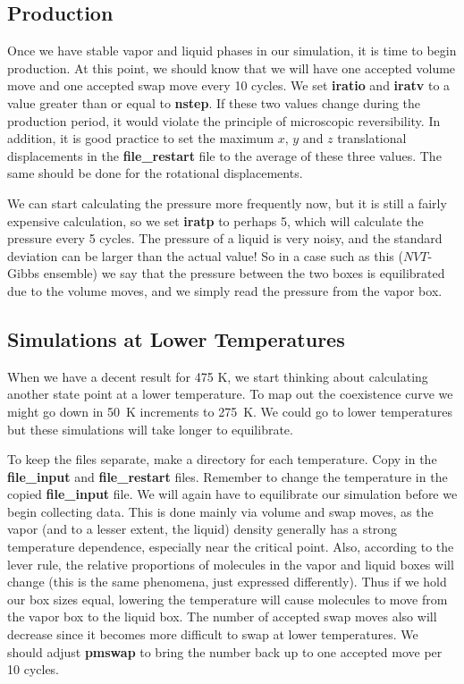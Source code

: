 \documentclass[12pt,letterpaper]{article}
\begin{document}
\subsection{Production}
Once we have stable vapor and liquid phases in our
simulation, it is time to begin production. At this point,
we should know that we will have one accepted volume move
and one accepted swap move every 10 cycles. We set {\bf
  iratio} and {\bf iratv} to a value greater than or equal
to {\bf nstep}. If these two values change during the
production period, it would violate the principle of
microscopic reversibility. In addition, it is good practice
to set the maximum $x$, $y$ and $z$ translational
displacements in the {\bf file\_restart} file to the average
of these three values. The same should be done for the
rotational displacements.

We can start calculating the pressure more frequently now,
but it is still a fairly expensive calculation, so we set
{\bf iratp} to perhaps 5, which will calculate the pressure
every 5 cycles. The pressure of a liquid is very noisy, and
the standard deviation can be larger than the actual value!
So in a case such as this ($NVT$-Gibbs ensemble) we say that
the pressure between the two boxes is equilibrated due to
the volume moves, and we simply read the pressure from the
vapor box.

\subsection{Simulations at Lower Temperatures}
When we have a decent result for 475 K, we start thinking
about calculating another state point at a lower
temperature. To map out the coexistence curve we might go
down in 50~K increments to 275~K. We could go to lower
temperatures but these simulations will take longer to
equilibrate.

To keep the files separate, make a directory for each
temperature. Copy in the {\bf file\_input} and {\bf
  file\_restart} files. Remember to change the temperature
in the copied {\bf file\_input} file. We will again have to
equilibrate our simulation before we begin collecting data.
This is done mainly via volume and swap moves, as the vapor
(and to a lesser extent, the liquid) density generally has a
strong temperature dependence, especially near the critical
point. Also, according to the lever rule, the relative
proportions of molecules in the vapor and liquid boxes will
change (this is the same phenomena, just expressed
differently). Thus if we hold our box sizes equal, lowering
the temperature will cause molecules to move from the vapor
box to the liquid box. The number of accepted swap moves
also will decrease since it becomes more difficult to swap
at lower temperatures. We should adjust {\bf pmswap} to
bring the number back up to one accepted move per 10 cycles.
\end{document}
